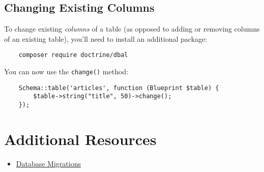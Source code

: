 \pagebreak

\subsection{Changing Existing Columns}

To change existing \textit{columns} of a table (as opposed to adding or removing columns of an existing table), you'll need to install an additional package:

\begin{verbatim}
    composer require doctrine/dbal
\end{verbatim}

You can now use the \texttt{change()} method:

\begin{verbatim}
    Schema::table('articles', function (Blueprint $table) {
        $table->string("title", 50)->change();
    });
\end{verbatim}



\section{Additional Resources}

\begin{itemize}[leftmargin=*]
    \item \href{http://laravel.com/docs/master/migrations}{Database Migrations}
\end{itemize}
